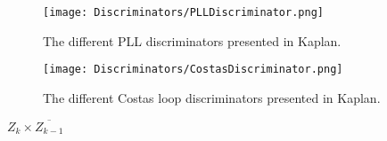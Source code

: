 \begin{figure}[!htb] 
    \centering
    \texttt{[image: Discriminators/PLLDiscriminator.png]} 
    \caption{The different PLL discriminators presented in Kaplan.\cite{Kaplan}}
    \label{fig:PLLDiscriminatorTable}
\end{figure}

\begin{figure}[!htb] 
    \centering
    \texttt{[image: Discriminators/CostasDiscriminator.png]} 
    \caption{The different Costas loop discriminators presented in Kaplan.\cite{Kaplan}}
    \label{fig:CostasDiscriminatorTable}
\end{figure}

$Z_{k} \times \overline{Z_{k-1}}$

%
